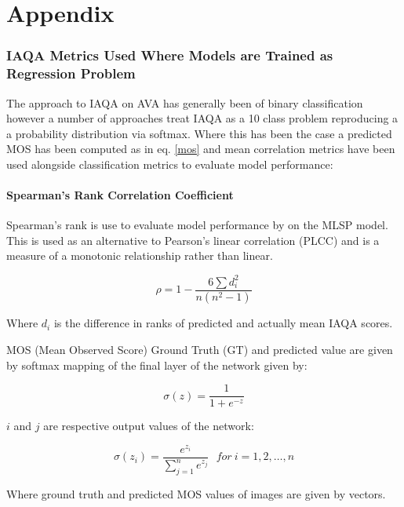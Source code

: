 \chapter{Appendix}
\label{chap:Appendix} 

\subsection{IAQA Metrics Used Where Models are Trained as Regression Problem}

The approach to IAQA on AVA has generally been of binary classification however a number of approaches treat IAQA as a 10 class problem reproducing a a probability distribution via softmax. Where this has been the case a predicted MOS has been computed as in eq. \ref{mos} and mean correlation metrics have been used alongside classification metrics to evaluate model performance:

\subsubsection{Spearman's Rank Correlation Coefficient}

Spearman's rank is use to evaluate model performance by  \cite{Talebi2018} on the MLSP model. This is used as an alternative to Pearson's linear correlation (PLCC)  and is a measure of a monotonic relationship rather than linear. 

\begin{equation}
\label{SRCC}
    \rho = 1- {\frac {6 \sum d_i^2}{n(n^2 - 1)}}
\end{equation}

Where $d_i$ is the difference in ranks of predicted and actually mean IAQA scores. 

MOS (Mean Observed Score) Ground Truth (GT) and predicted value are given by softmax mapping of the final layer of the network given by:

\begin{equation}
    \sigma(z) = \frac{1} {1 + e^{-z}}
\end{equation}

$i$ and $j$ are respective output values of the network:

\begin{equation}
    \sigma(z_i) = \frac{e^{z_{i}}}{\sum_{j=1}^n e^{z_{j}}} \ \ \ for\ i=1,2,\dots,n
\end{equation}



Where ground truth and predicted MOS values of images are given by vectors. 


